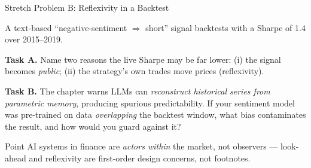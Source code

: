 \documentclass[9pt,t]{beamer}
\begin{document}
\begin{frame}[noframenumbering]{Stretch Problem B: Reflexivity in a Backtest}

A text-based ``negative-sentiment $\Rightarrow$ short'' signal backtests with a
Sharpe of 1.4 over 2015--2019.

\medskip
\textbf{Task A.} Name two reasons the live Sharpe may be far lower: (i) the signal
becomes \emph{public}; (ii) the strategy's own trades move prices (reflexivity).

\medskip
\textbf{Task B.} The chapter warns LLMs can \emph{reconstruct historical series
from parametric memory}, producing spurious predictability. If your sentiment
model was pre-trained on data \emph{overlapping} the backtest window, what bias
contaminates the result, and how would you guard against it?

\medskip
\begin{block}{Point}
AI systems in finance are \emph{actors within} the market, not observers ---
look-ahead and reflexivity are first-order design concerns, not footnotes.
\end{block}
\end{frame}
\end{document}
